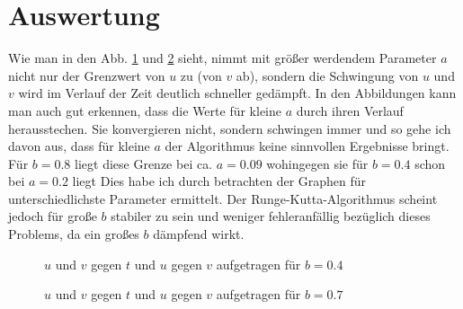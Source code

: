 \documentclass[12pt,a4paper,titlepage,headinclude,bibtotoc]{scrartcl}
\begin{document}
\section{Auswertung}
\label{sec:auswertung}
Wie man in den Abb. \ref{fig:b04} und \ref{fig:b07} sieht, nimmt mit größer werdendem Parameter $a$ nicht nur der Grenzwert von $u$ zu (von $v$ ab), sondern die Schwingung von $u$ und $v$ wird im Verlauf der Zeit deutlich schneller gedämpft.
In den Abbildungen kann man auch gut erkennen, dass die Werte für kleine $a$ durch ihren Verlauf herausstechen.
Sie konvergieren nicht, sondern schwingen immer und so gehe ich davon aus, dass für kleine $a$ der Algorithmus keine sinnvollen Ergebnisse bringt.
Für $b=0.8$ liegt diese Grenze bei ca. $a=0.09$ wohingegen sie für $b=0.4$ schon bei $a=0.2$ liegt
Dies habe ich durch betrachten der Graphen für unterschiedlichste Parameter ermittelt.
Der Runge-Kutta-Algorithmus scheint jedoch für große $b$ stabiler zu sein und weniger fehleranfällig bezüglich dieses Problems, da ein großes $b$ dämpfend wirkt.

\begin{figure}[h]
   \centering
   \hfill
   \hfill
   \caption{$u$ und $v$ gegen $t$ und $u$ gegen $v$ aufgetragen für $b=0.4$}
   \label{fig:b04}
 \end{figure}
 \begin{figure}[h]
   \centering
   \hfill
   \hfill
   \caption{$u$ und $v$ gegen $t$ und $u$ gegen $v$ aufgetragen für $b=0.7$}
   \label{fig:b07}
 \end{figure}
\end{document}
